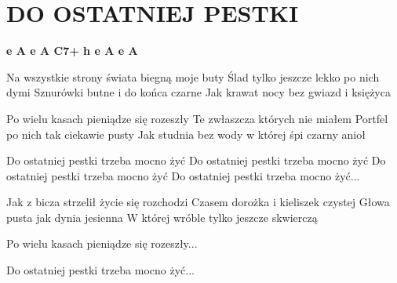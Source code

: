 \documentclass[../../../songbook.tex]{subfiles}
\begin{document}
\TabPositions{8cm} %
\section*{DO OSTATNIEJ PESTKI}
\vspace{0.5cm}
{\color{red}\textbf{e A e A C7+ h e A e A} } \newline

Na wszystkie strony świata biegną moje buty 	 \newline
Ślad tylko jeszcze lekko po nich dymi 			 \newline
Sznurówki butne i do końca czarne 				 \newline
Jak krawat nocy bez gwiazd i księżyca 			 \newline

Po wielu kasach pieniądze się rozeszły  		 \newline
Te zwłaszcza których nie miałem 				 \newline
Portfel po nich tak ciekawie pusty  			 \newline
Jak studnia bez wody w której śpi czarny anioł 	 \newline

\-\hspace{1cm} Do ostatniej pestki trzeba mocno żyć  	  \newline
\-\hspace{1cm} Do ostatniej pestki trzeba mocno żyć  \newline
\-\hspace{1cm} Do ostatniej pestki trzeba mocno żyć  \newline
\-\hspace{1cm} Do ostatniej pestki trzeba mocno żyć...  \newline

Jak z bicza strzelił życie się rozchodzi  \newline
Czasem dorożka i kieliszek czystej  \newline
Głowa pusta jak dynia jesienna  \newline
W której wróble tylko jeszcze skwierczą  \newline

Po wielu kasach pieniądze się rozeszły...  \newline

\-\hspace{1cm} Do ostatniej pestki trzeba mocno żyć...
	
\end{document}
